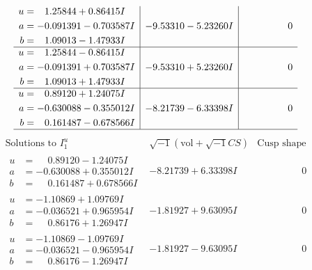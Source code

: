 \documentclass[1p]{elsarticle_modified}
\theoremstyle{definition}
\newcommand{\I}{\sqrt{-1}}
\begin{document}
$$\begin{array}{c|c|c}
\begin{aligned}
u &= \phantom{-}1.25844 + 0.86415 I \\
a &= -0.091391 - 0.703587 I \\
b &= \phantom{-}1.09013 - 1.47933 I\end{aligned}
 & -9.53310 - 5.23260 I & \phantom{-0.000000 } 0 \\ \hline\begin{aligned}
u &= \phantom{-}1.25844 - 0.86415 I \\
a &= -0.091391 + 0.703587 I \\
b &= \phantom{-}1.09013 + 1.47933 I\end{aligned}
 & -9.53310 + 5.23260 I & \phantom{-0.000000 } 0 \\ \hline\begin{aligned}
u &= \phantom{-}0.89120 + 1.24075 I \\
a &= -0.630088 - 0.355012 I \\
b &= \phantom{-}0.161487 - 0.678566 I\end{aligned}
 & -8.21739 - 6.33398 I & \phantom{-0.000000 } 0\\
 \hline 
 \end{array}$$\newpage$$\begin{array}{c|c|c}  
\text{Solutions to }I^u_{1}& \I (\text{vol} + \sqrt{-1}CS) & \text{Cusp shape}\\
 \hline 
\begin{aligned}
u &= \phantom{-}0.89120 - 1.24075 I \\
a &= -0.630088 + 0.355012 I \\
b &= \phantom{-}0.161487 + 0.678566 I\end{aligned}
 & -8.21739 + 6.33398 I & \phantom{-0.000000 } 0 \\ \hline\begin{aligned}
u &= -1.10869 + 1.09769 I \\
a &= -0.036521 + 0.965954 I \\
b &= \phantom{-}0.86176 + 1.26947 I\end{aligned}
 & -1.81927 + 9.63095 I & \phantom{-0.000000 } 0 \\ \hline\begin{aligned}
u &= -1.10869 - 1.09769 I \\
a &= -0.036521 - 0.965954 I \\
b &= \phantom{-}0.86176 - 1.26947 I\end{aligned}
 & -1.81927 - 9.63095 I & \phantom{-0.000000 } 0 \\ \hline\begin{aligned}

\end{aligned}
\end{array}$$
\end{document}

